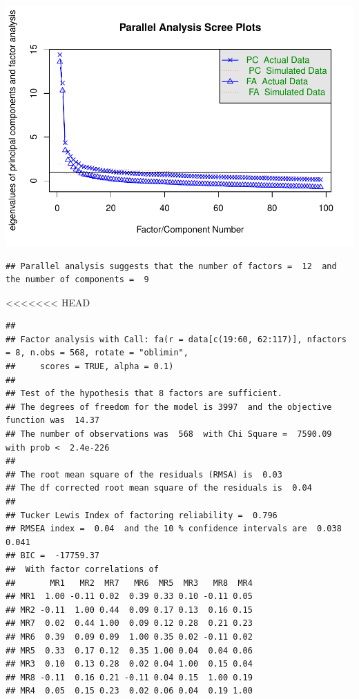 \documentclass[
  english,
  man]{apa6}
\begin{document}
\includegraphics{SIOP_Onet_FA_files/figure-latex/scree plot-1.pdf}

\begin{verbatim}
## Parallel analysis suggests that the number of factors =  12  and the number of components =  9
\end{verbatim}

<<<<<<< HEAD
\begin{verbatim}
## 
## Factor analysis with Call: fa(r = data[c(19:60, 62:117)], nfactors = 8, n.obs = 568, rotate = "oblimin", 
##     scores = TRUE, alpha = 0.1)
## 
## Test of the hypothesis that 8 factors are sufficient.
## The degrees of freedom for the model is 3997  and the objective function was  14.37 
## The number of observations was  568  with Chi Square =  7590.09  with prob <  2.4e-226 
## 
## The root mean square of the residuals (RMSA) is  0.03 
## The df corrected root mean square of the residuals is  0.04 
## 
## Tucker Lewis Index of factoring reliability =  0.796
## RMSEA index =  0.04  and the 10 % confidence intervals are  0.038 0.041
## BIC =  -17759.37
##  With factor correlations of 
##       MR1   MR2  MR7   MR6  MR5  MR3   MR8  MR4
## MR1  1.00 -0.11 0.02  0.39 0.33 0.10 -0.11 0.05
## MR2 -0.11  1.00 0.44  0.09 0.17 0.13  0.16 0.15
## MR7  0.02  0.44 1.00  0.09 0.12 0.28  0.21 0.23
## MR6  0.39  0.09 0.09  1.00 0.35 0.02 -0.11 0.02
## MR5  0.33  0.17 0.12  0.35 1.00 0.04  0.04 0.06
## MR3  0.10  0.13 0.28  0.02 0.04 1.00  0.15 0.04
## MR8 -0.11  0.16 0.21 -0.11 0.04 0.15  1.00 0.19
## MR4  0.05  0.15 0.23  0.02 0.06 0.04  0.19 1.00
\end{verbatim}
\end{document}
